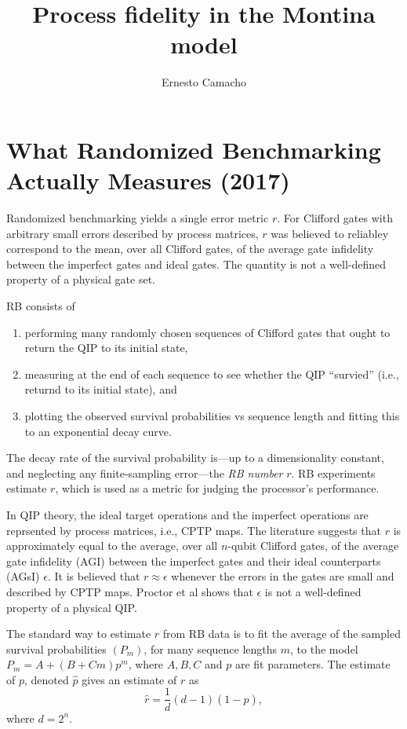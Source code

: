 \documentclass[a4paper]{article}
\title{Process fidelity in the Montina model}
\author{Ernesto Camacho}
\begin{document}
    \maketitle

    \section{What Randomized Benchmarking Actually Measures
    (2017)}

    Randomized benchmarking yields a single error metric
    $r$. For Clifford gates with arbitrary small errors
    described by process matrices, $r$ was believed to
    reliabley correspond to the mean, over all Clifford
    gates, of the average gate infidelity between the
    imperfect gates and ideal gates. The quantity is not a
    well-defined property of a physical gate set.

    RB consists of
    \begin{enumerate}
        \item performing many randomly chosen sequences of
            Clifford gates that ought to return the QIP to
            its initial state,
        \item measuring at the end of each sequence to see
            whether the QIP ``survied'' (i.e., returnd to
            its initial state), and 
        \item plotting the observed survival probabilities
            vs sequence length and fitting this to an
            exponential decay curve.
    \end{enumerate}
    The decay rate of the survival probability is---up to a
    dimensionality constant, and neglecting any
    finite-sampling error---the \textit{RB number} $r$. RB
    experiments estimate $r$, which is used as a metric for
    judging the processor's performance.

    In QIP theory, the ideal target operations and the
    imperfect operations are reprsented by process matrices,
    i.e., CPTP maps. The literature suggests that $r$ is
    approximately equal to the average, over all $n$-qubit
    Clifford gates, of the average gate infidelity (AGI)
    between the imperfect gates and their ideal counterparts
    (AGsI) $\epsilon$. It is believed that $r \approx
    \epsilon$ whenever the errors in the gates are small and
    described by CPTP maps. Proctor et al shows that
    $\epsilon$ is not a well-defined property of a physical
    QIP.

    The standard way to estimate $r$ from RB data is to fit
    the average of the sampled survival probabilities
    $(P_m)$, for many sequence lengths $m$, to the model
    $P_m = A + (B + Cm) p^{m}$, where $A,B,C$ and $p$ are
    fit parameters. The estimate of $p$, denoted $\hat{p}$ 
    gives an estimate of $r$ as 
    \begin{equation}
        \hat{r}
        = \frac{1}{d} (d-1)(1 - \hat{p}),
    \end{equation}
    where $d = 2^{n}$.
\end{document}
